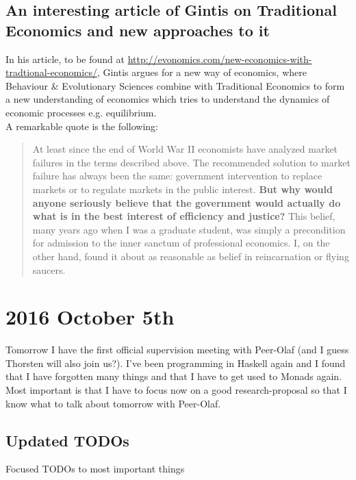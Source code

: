 \subsection*{An interesting article of Gintis on Traditional Economics and new approaches to it}
In his article, to be found at \url{http://evonomics.com/new-economics-with-tradtional-economics/}, Gintis argues for a new way of economics, where Behaviour \& Evolutionary Sciences combine with Traditional Economics to form a new understanding of economics which tries to understand the dynamics of economic processes e.g. equilibrium. \\

A remarkable quote is the following:

\begin{quote}
At least since the end of World War II economists have analyzed market failures in the terms described above. The recommended solution to market failure has always been the same: government intervention to replace markets or to regulate markets in the public interest. \textbf{But why would anyone seriously believe that the government would actually do what is in the best interest of efficiency and justice?} This belief, many years ago when I was a graduate student, was simply a precondition for admission to the inner sanctum of professional economics. I, on the other hand, found it about as reasonable as belief in reincarnation or flying saucers.
\end{quote}

\section*{2016 October 5th}
Tomorrow I have the first official supervision meeting with Peer-Olaf (and I guess Thorsten will also join us?). I've been programming in Haskell again and I found that I have forgotten many things and that I have to get used to Monads again. Most important is that I have to focus now on a good research-proposal so that I know what to talk about tomorrow with Peer-Olaf.

\subsection*{Updated TODOs}
Focused TODOs to most important things

